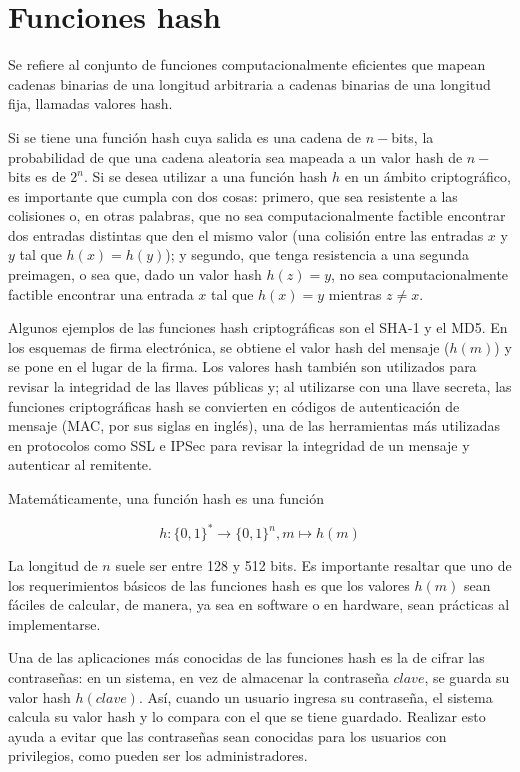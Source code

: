 %
%

\section{Funciones hash}

Se refiere al conjunto de funciones computacionalmente eficientes que
mapean cadenas binarias de una longitud arbitraria a cadenas binarias
de una longitud fija, llamadas valores hash.

Si se tiene una función hash cuya salida es una cadena de $n-$bits,
la probabilidad de que una cadena aleatoria
sea mapeada a un valor hash de $n-$bits es de $2^n$. Si se desea utilizar
a una función hash $h$ en un ámbito criptográfico, es importante que
cumpla con dos cosas: primero, que sea resistente a las colisiones o,
en otras palabras, que no sea computacionalmente factible encontrar dos entradas distintas que den el mismo valor (una colisión entre las entradas $x$ y $y$ tal que $h(x) = h(y)$); y segundo, que tenga resistencia a una segunda preimagen, o sea que, dado un valor hash $h(z) = y$, no sea computacionalmente factible encontrar una entrada $x$ tal que $h(x) = y$ mientras $z \neq x$.

Algunos ejemplos de las funciones hash criptográficas son el SHA-1 y el
MD5. En los esquemas de firma electrónica, se obtiene el valor hash del
mensaje ($h(m)$) y se pone en el lugar de la firma. Los valores hash
también son utilizados para revisar la integridad de las llaves públicas
y; al utilizarse con una llave secreta, las funciones criptográficas hash
se convierten en códigos de autenticación de mensaje (MAC, por sus siglas
en inglés), una de las herramientas más utilizadas en protocolos como SSL
e IPSec para revisar la integridad de un mensaje y autenticar al
remitente.

Matemáticamente, una función hash es una función

\begin{equation}
  \label{funcion_hash_def}
 	h: \{0, 1\}^* \longrightarrow \{0,1\}^n, m \longmapsto h(m)
\end{equation}

La longitud de $n$ suele ser entre 128 y 512 bits.
Es importante resaltar que uno de los requerimientos básicos de las
funciones hash es que los valores $h(m)$ sean fáciles de calcular,
de manera, ya sea en software o en hardware, sean prácticas al
implementarse.

Una de las aplicaciones más conocidas de las funciones hash es la de
cifrar las contraseñas: en un sistema, en vez de almacenar la contraseña
$clave$, se guarda su valor hash $h(clave)$. Así, cuando un usuario
ingresa su contraseña, el sistema calcula su valor hash y lo compara con
el que se tiene guardado. Realizar esto ayuda a evitar que las contraseñas
sean conocidas para los usuarios con privilegios, como pueden ser los
administradores.


